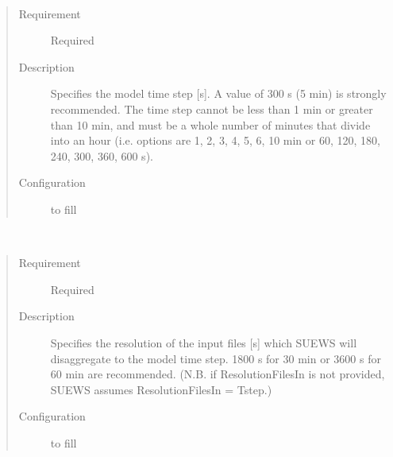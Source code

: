 \documentclass[letterpaper,10pt,english]{sphinxmanual}
\begin{document}
\begin{fulllineitems}
\label{\detokenize{input_files/RunControl/Time_related_options:cmdoption-arg-tstep}}~\begin{quote}\begin{description}
\item[{Requirement}] \leavevmode
Required

\item[{Description}] \leavevmode
Specifies the model time step {[}s{]}. A value of 300 s (5 min) is strongly recommended. The time step cannot be less than 1 min or greater than 10 min, and must be a whole number of minutes that divide into an hour (i.e. options are 1, 2, 3, 4, 5, 6, 10 min or 60, 120, 180, 240, 300, 360, 600 s).

\item[{Configuration}] \leavevmode
to fill

\end{description}\end{quote}

\end{fulllineitems}


\begin{fulllineitems}
\label{\detokenize{input_files/RunControl/Time_related_options:cmdoption-arg-resolutionfilesin}}~\begin{quote}\begin{description}
\item[{Requirement}] \leavevmode
Required

\item[{Description}] \leavevmode
Specifies the resolution of the input files {[}s{]} which SUEWS will disaggregate to the model time step. 1800 s for 30 min or 3600 s for 60 min are recommended. (N.B. if ResolutionFilesIn is not provided, SUEWS assumes ResolutionFilesIn = Tstep.)

\item[{Configuration}] \leavevmode
to fill

\end{description}\end{quote}

\end{fulllineitems}
\end{document}
